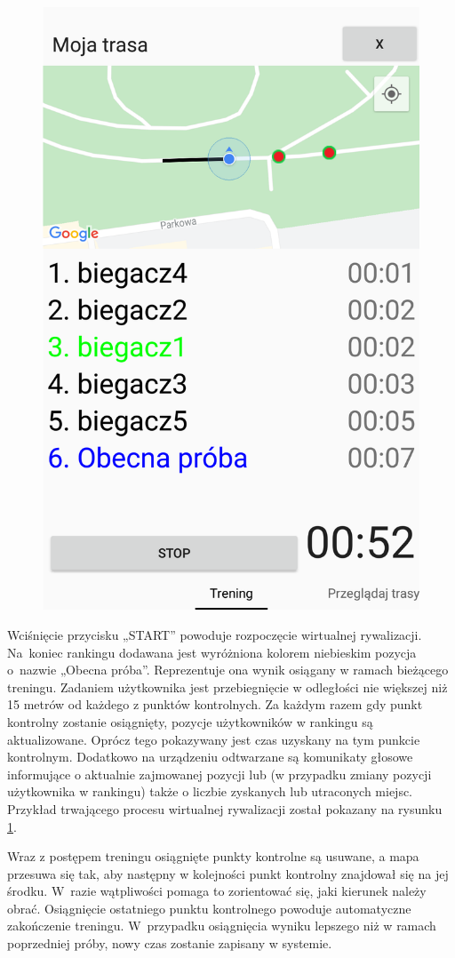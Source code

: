 \begin{figure}[H]
\begin{minipage}{.5\textwidth}
  \includegraphics[width=.8\linewidth,frame]{img/rywalizacjaw2}
  \label{image:rywalizacjaw2}
\end{minipage}
\end{figure}
Wciśnięcie przycisku „START” powoduje rozpoczęcie wirtualnej rywalizacji. Na~koniec rankingu dodawana jest wyróżniona kolorem niebieskim pozycja o~nazwie „Obecna próba”. Reprezentuje ona wynik osiągany w ramach bieżącego treningu. Zadaniem użytkownika jest przebiegnięcie w odległości nie większej niż 15 metrów od każdego z punktów kontrolnych. Za każdym razem gdy punkt kontrolny zostanie osiągnięty, pozycje użytkowników w rankingu są aktualizowane. Oprócz tego pokazywany jest czas uzyskany na tym punkcie kontrolnym.  Dodatkowo na urządzeniu odtwarzane są komunikaty głosowe informujące o aktualnie zajmowanej pozycji lub (w przypadku zmiany pozycji użytkownika w rankingu) także o liczbie zyskanych lub utraconych miejsc. Przykład trwającego procesu wirtualnej rywalizacji został pokazany na rysunku \ref{image:rywalizacjaw2}.

Wraz z postępem treningu osiągnięte punkty kontrolne są usuwane, a mapa przesuwa się tak, aby następny w kolejności punkt kontrolny znajdował się na jej środku. W~razie wątpliwości pomaga to zorientować się, jaki kierunek należy obrać. Osiągnięcie ostatniego punktu kontrolnego powoduje automatyczne zakończenie treningu. W~przypadku osiągnięcia wyniku lepszego niż w ramach poprzedniej próby, nowy czas zostanie zapisany w systemie.